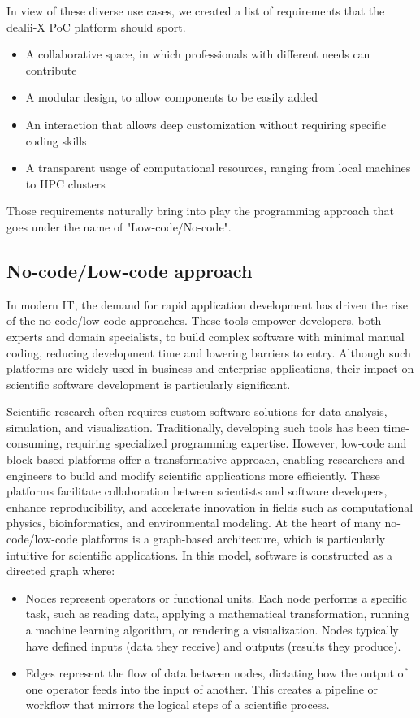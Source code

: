 \documentclass[a4paper,12pt]{article}
\begin{document}
In view of these diverse use cases, we created a list of requirements that the dealii-X PoC platform should sport.
\begin{itemize}
    \item A collaborative space, in which professionals with different needs can contribute
    \item A modular design, to allow components to be easily added
    \item An interaction that allows deep customization without requiring specific coding skills
    \item A transparent usage of computational resources, ranging from local machines to HPC clusters
\end{itemize}

Those requirements naturally bring into play the programming approach that goes under the name of "Low-code/No-code".

\subsection{\textcolor{EUblue}{No-code/Low-code approach}}

In modern IT, the demand for rapid application development has driven the rise of the no-code/low-code approaches. These tools empower developers, both experts and domain specialists, to build complex software with minimal manual coding, reducing development time and lowering barriers to entry. Although such platforms are widely used in business and enterprise applications, their impact on scientific software development is particularly significant.

Scientific research often requires custom software solutions for data analysis, simulation, and visualization. Traditionally, developing such tools has been time-consuming, requiring specialized programming expertise. However, low-code and block-based platforms offer a transformative approach, enabling researchers and engineers to build and modify scientific applications more efficiently. These platforms facilitate collaboration between scientists and software developers, enhance reproducibility, and accelerate innovation in fields such as computational physics, bioinformatics, and environmental modeling.
At the heart of many no-code/low-code platforms is a graph-based architecture, which is particularly intuitive for scientific applications. In this model, software is constructed as a directed graph where:

\begin{itemize}
\item Nodes represent operators or functional units. Each node performs a specific task, such as reading data, applying a mathematical transformation, running a machine learning algorithm, or rendering a visualization. Nodes typically have defined inputs (data they receive) and outputs (results they produce).

\item Edges represent the flow of data between nodes, dictating how the output of one operator feeds into the input of another. This creates a pipeline or workflow that mirrors the logical steps of a scientific process.
\end{itemize}
\end{document}
